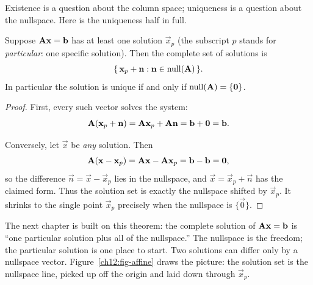 Existence is a question about the column space; uniqueness is a question about
the nullspace. Here is the uniqueness half in full.

\begin{theorem}\label{ch12:uniqueness}
Suppose $\mathbf{A}\mathbf{x}=\mathbf{b}$ has at least one solution $\vec{x}_p$ (the
subscript $p$ stands for \emph{particular}: one specific solution). Then the
complete set of solutions is
\[
  \{\,\mathbf{x}_p + \mathbf{n} : \mathbf{n}\in\operatorname{null}(\mathbf{A})\,\}.
\]
In particular the solution is unique if and only if $\operatorname{null}(\mathbf{A})=\{\mathbf{0}\}$.
\end{theorem}

\begin{proof}
First, every such vector solves the system:
\[
  \mathbf{A}(\mathbf{x}_p+\mathbf{n}) = \mathbf{A}\mathbf{x}_p + \mathbf{A}\mathbf{n} = \mathbf{b} + \mathbf{0} = \mathbf{b}.
\]

Conversely, let $\vec{x}$ be \emph{any} solution. Then
\[
  \mathbf{A}(\mathbf{x}-\mathbf{x}_p) = \mathbf{A}\mathbf{x} - \mathbf{A}\mathbf{x}_p
  = \mathbf{b}-\mathbf{b} = \mathbf{0},
\]
so the difference $\vec{n} = \vec{x}-\vec{x}_p$ lies in the nullspace, and $\vec{x}
= \vec{x}_p + \vec{n}$ has the claimed form. Thus the solution set is exactly the
nullspace shifted by $\vec{x}_p$. It shrinks to the single point $\vec{x}_p$
precisely when the nullspace is $\{\vec 0\}$. \qedhere
\end{proof}

The next chapter is built on this theorem: the complete solution of
$\mathbf{A}\mathbf{x}=\mathbf{b}$ is ``one particular solution plus all of the
nullspace.'' The nullspace is the freedom; the particular solution is one place
to start. Two solutions can differ only by a nullspace vector. Figure~\ref{ch12:fig-affine} draws the picture: the solution set is the
nullspace line, picked up off the origin and laid down through $\vec{x}_p$.

